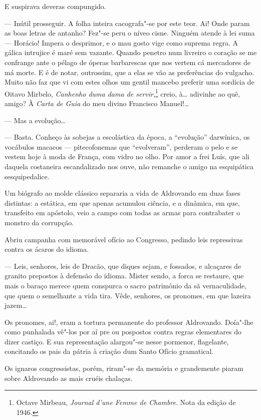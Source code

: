 E suspirava deveras compungido.

--- Inútil prosseguir. A folha inteira cacografa"-se por este teor. Ai!
Onde param as boas letras de antanho? Fez"-se peru o níveo cisne. Ninguém
atende à lei suma --- Horácio! Impera o desprimor, e o mau gosto vige
como suprema regra. A gálica intrujice é maré sem vazante. Quando
penetro num livreiro o coração se me confrange ante o pélago de óperas
barbarescas que nos vertem cá mercadores de má morte. E é de notar,
outrossim, que a elas se vão as preferências do vulgacho. Muito não faz
que vi com estes olhos um gentil mancebo preferir uma sordícia de Oitavo
Mirbelo, \emph{Canhenho duma dama de servir},\footnote{Octave Mirbeau,
  \emph{Journal d'une Femme de Chambre}. Nota da edição de 1946.} creio,
à\ldots{} adivinhe ao quê, amigo? À \emph{Carta de Guia} do meu divino
Francisco Manuel!\ldots{}

--- Mas a evolução\ldots{}

--- Basta. Conheço às sobejas a escolástica da época, a ``evolução''
darwínica, os vocábulos macacos --- pitecofonemas que ``evolveram'',
perderam o pelo e se vestem hoje à moda de França, com vidro no olho.
Por amor a frei Luís, que ali daquela costaneira escandalizado nos ouve,
não remanche o amigo na esquipática sesquipedalice.

Um biógrafo ao molde clássico separaria a vida de Aldrovando em duas
fases distintas: a estática, em que apenas acumulou ciência, e a
dinâmica, em que, transfeito em apóstolo, veio a campo com todas as
armas para contrabater o monstro da corrupção.

Abriu campanha com memorável ofício ao Congresso, pedindo leis
repressivas contra os ácaros do idioma.

--- Leis, senhores, leis de Dracão, que diques sejam, e fossados, e
alcaçares de granito prepostos à defensão do idioma. Mister sendo, a
forca se restaure, que mais o baraço merece quem conspurca o sacro
patrimônio da sã vernaculidade, que quem o semelhante a vida tira. Vêde,
senhores, os pronomes, em que lazeira jazem\ldots{}

Os pronomes, ai!, eram a tortura permanente do professor Aldrovando.
Doía"-lhe como punhalada vê"-los por aí pre ou pospostos contra regras
elementares do dizer castiço. E sua representação alargou"-se nesse
pormenor, flagelante, concitando os pais da pátria à criação dum Santo
Ofício gramatical.

Os ignaros congressistas, porém, riram"-se da memória e grandemente
piaram sobre Aldrovando as mais cruéis chalaças.

